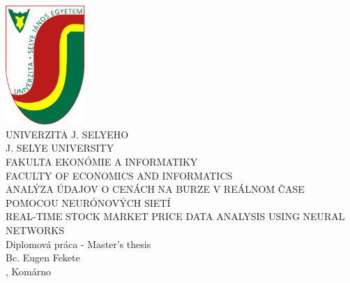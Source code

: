 \documentclass[a4paper,oneside,onecolumn,12pt]{book}
\begin{document}
\thispagestyle{empty}
\begin{minipage}[c][\textheight][c]{\textwidth}
	{\centering
	\includegraphics[keepaspectratio,width=3cm]{SelyeBanner.png}\\
	\vskip0.5cm
	{\LARGE UNIVERZITA J. SELYEHO}\\
	\vskip0.5cm
	{\LARGE J. SELYE UNIVERSITY}\\
    \vskip0.5cm
	{\large FAKULTA EKONÓMIE A INFORMATIKY}\\
	\vskip0.5cm
	{\large FACULTY OF ECONOMICS AND INFORMATICS}\\
	\vfill
	{\Large ANALÝZA ÚDAJOV O CENÁCH NA BURZE V REÁLNOM ČASE POMOCOU NEURÓNOVÝCH SIETÍ}\\
	\vskip0.5cm
	{\Large REAL-TIME STOCK MARKET PRICE DATA ANALYSIS USING NEURAL NETWORKS}\\
	\vskip0.5cm
	Diplomová práca - Master's thesis\\
	\vfill
	Bc. Eugen Fekete \\
	\hfill\the\year{}, Komárno\hfill
	}
\end{minipage}
\begingroup
\makeatletter
\end{document}
